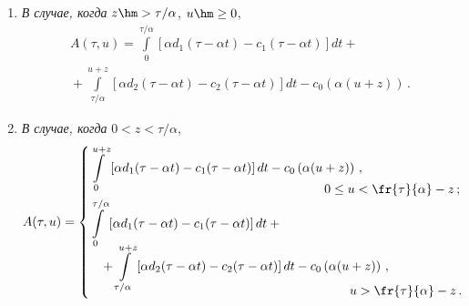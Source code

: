   \begin{enumerate}[1.]

\item \textit{В случае, когда} $z\hm> \tau/\alpha$, $u\hm\geq0$,\\[-18pt] 

\begin{multline}

A(\tau,u)=\int\limits_0^{\tau/\alpha} \left[ \alpha d_1(\tau-\alpha t)-c_1(\tau-\alpha 

t)\right]dt+{}\\[-9pt]

{}+

\int\limits^{u+z}_{\tau/\alpha} \left[ \alpha d_2(\tau-\alpha t)-c_2(\tau-\alpha t)\right] 

dt-c_0\left(\alpha \left(u +z\right)\right)\,.

\label{e3-sh}

\end{multline}

\item \textit{В случае, когда} $0<z<\tau/\alpha$,\\[-6pt] 

\begin{equation}

A(\tau,u)= \begin{cases}

\displaystyle \int\limits_0^{u+z} \left[ \alpha d_1(\tau-\alpha t)-

c_1(\tau-\alpha t)\right]dt -c_0 \left(\alpha (u+z)\right)\,, \\[-9pt]

\hspace*{65mm}0\leq u<\fr{\tau}{\alpha}-z\,;\\

\displaystyle \int\limits_0^{\tau/\alpha} \left[ \alpha d_1(\tau-\alpha t) -

c_1(\tau- \alpha t)\right]dt +{}\\[-3pt]

\hspace*{3mm}{}+

\displaystyle\int\limits_{\tau/\alpha}^{u+z} \left[ \alpha d_2(\tau-\alpha t)-

c_2(\tau-\alpha t)\right]dt- c_0\left(\alpha(u+z)\right)\,, \\[-9pt]

\hspace*{72mm} u>\fr{\tau}{\alpha}-z\,.

\end{cases}

\label{e4-sh}

\end{equation}

  \end{enumerate}

